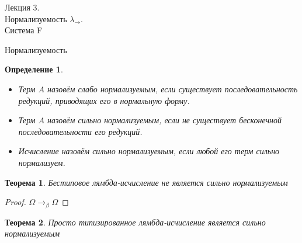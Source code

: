 \documentclass[aspectratio=169]{beamer}
\begin{document}
\newtheorem{dfn}{Определение}[section]
\newtheorem{nte}{Замечание}[section]

\newtheorem{axiom}{Аксиома}[section]
\newtheorem{thm}{Теорема}[section]
\newtheorem{lmm}[theorem]{Лемма}
\newtheorem{statement}{Утверждение}[section]
\newtheorem{oun_paragraph}{Пункт}[section]
\newtheorem{cons}{Следствие}[section]
\newtheorem*{exm}{Пример}

\newcommand{\comb}[1]{\operatorname{\bf{\textrm{#1}}}}
\newcommand{\func}[1]{\operatorname{#1}}
\newcommand{\reduction}[1]{{\color{OrangeRed}#1}}
\newcommand{\set}[1]{\left\{#1\right\}}

\def\from#1{\par \parbox{0.7\textwidth}{\par \hfill\raggedleft \it #1}} 

\begin{frame}{}
\begin{center}\Large Лекция 3.\\ \Large Нормализуемость $\lambda_\rightarrow$.\\Система F\end{center}
\end{frame}

\begin{frame}{Нормализуемость}
\begin{dfn}
\begin{itemize}
\item Терм $A$ назовём слабо нормализуемым, если существует последовательность редукций,
приводящих его в нормальную форму.
\item Терм $A$ назовём сильно нормализуемым, если не существует бесконечной последовательности
его редукций.
\item Исчисление назовём сильно нормализуемым, если любой его терм сильно нормализуем.
\end{itemize}
\end{dfn}

\vspace{-0.3cm}
\begin{thm}Бестиповое лямбда-исчисление не является сильно нормализуемым\end{thm}
\vspace{-0.3cm}
\begin{proof}$\Omega \rightarrow_\beta \Omega$\end{proof}

\begin{thm}Просто типизированное лямбда-исчисление является сильно нормализуемым\end{thm}
\end{frame}
\end{document}
